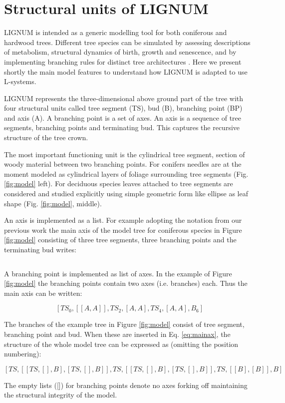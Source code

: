 \section{Structural units of LIGNUM}
LIGNUM is intended as a generic modelling tool for both coniferous and
hardwood trees.  Different tree  species can be simulated by assessing
descriptions of  metabolism, structural dynamics of  birth, growth and
senescence,  and by  implementing  branching rules  for distinct  tree
architectures  \citep{perttunen:96,  perttunen:01}.   Here we  present
shortly the main model features to understand how LIGNUM is adapted to
use L-systems.

LIGNUM represents the three-dimensional  above ground part of the tree
with  four  structural  units  called  tree  segment  (TS),  bud  (B),
branching point  (BP) and  axis (A).   A branching point  is a  set of
axes. An  axis is  a sequence of  tree segments, branching  points and
terminating bud.   This captures the  recursive structure of  the tree
crown.

The most  important functioning unit is the  cylindrical tree segment,
section of woody material  between two branching points.  For conifers
needles are  at the  moment modeled as  cylindrical layers  of foliage
surrounding tree segments (Fig.  \ref{fig:model} left).  For deciduous
species leaves  attached to tree  segments are considered  and studied
explicitly  using simple  geometric form  like ellipse  as  leaf shape
(Fig. \ref{fig:model}, middle).

An axis  is implemented as a  list. For example  adopting the notation
from our previous work \citep{perttunen:96} the main axis of the model
tree for  coniferous species  in Figure \ref{fig:model}  consisting of
three tree  segments, three branching  points and the  terminating bud
writes:

\begin{equation}
[TS_0,BP_1,TS_2,BP_3,TS_4,BP_5,B_6]
\end{equation}

A branching  point is implemented as  list of axes. In  the example of
Figure   \ref{fig:model}  the  branching   points  contain   two  axes
(i.e. branches) each. Thus the main axis can be written:

\begin{equation}\label{eq:mainax}
[TS_0,[[A,A]],TS_2,[A,A],TS_4,[A,A],B_6]
\end{equation}

The branches of the example  tree in Figure \ref{fig:model} consist of
tree  segment, branching  point and  bud. When  these are  inserted in
Eq. \ref{eq:mainax},  the structure  of  the whole  model  tree can  be
expressed as (omitting the position numbering):

\begin{equation}\label{eq:tree}
[TS,[[TS,[],B],[TS,[],B]],TS,[[TS,[],B],[TS,[],B]],TS,[[B],[B]],B]
\end{equation}

The empty lists  ([]) for branching points denote  no axes forking off
maintaining the structural integrity of the model.

